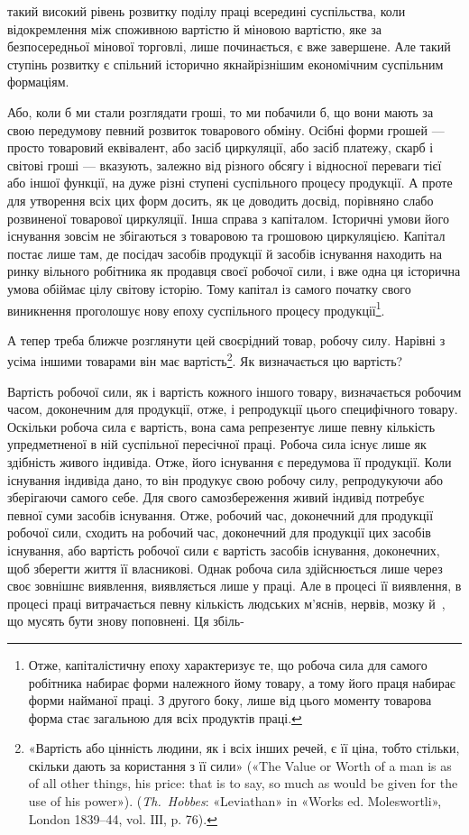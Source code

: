 \parcont{}  %
такий високий рівень розвитку поділу праці всередині суспільства,
коли відокремлення між споживною вартістю й міновою
вартістю, яке за безпосередньої мінової торговлі, лише починається,
є вже завершене. Але такий ступінь розвитку є спільний
історично якнайрізнішим економічним суспільним формаціям.

Або, коли б ми стали розглядати гроші, то ми побачили б,
що вони мають за свою передумову певний розвиток товарового
обміну. Осібні форми грошей — просто товаровий еквівалент,
або засіб циркуляції, або засіб платежу, скарб і світові гроші —
вказують, залежно від різного обсягу і відносної переваги тієї
або іншої функції, на дуже різні ступені суспільного процесу
продукції. А проте для утворення всіх цих форм досить, як це
доводить досвід, порівняно слабо розвиненої товарової циркуляції.
Інша справа з капіталом. Історичні умови його існування зовсім
не збігаються з товаровою та грошовою циркуляцією. Капітал
постає лише там, де посідач засобів продукції й засобів існування
находить на ринку вільного робітника як продавця своєї робочої
сили, і вже одна ця історична умова обіймає цілу світову історію.
Тому капітал із самого початку свого виникнення проголошує
нову епоху суспільного процесу продукції\footnote{
Отже, капіталістичну епоху характеризує те, що робоча сила для
самого робітника набирає форми належного йому товару, а тому його
праця набирає форми найманої праці. З другого боку, лише від цього моменту
товарова форма стає загальною для всіх продуктів праці.
}.

А тепер треба ближче розглянути цей своєрідний товар, робочу
силу. Нарівні з усіма іншими товарами він має вартість\footnote{
«Вартість або цінність людини, як і всіх інших речей, є її ціна,
тобто стільки, скільки дають за користання з її сили» («The Value or
Worth of a man is as of all other things, his price: that is to say, so much
as would be given for the use of his power»). (\emph{Th.~Hobbes}: «Leviathan»
in «Works ed. Moleswortli», London 1839--44, vol. IІІ, p. 76).
}. Як
визначається цю вартість?

Вартість робочої сили, як і вартість кожного іншого товару,
визначається робочим часом, доконечним для продукції, отже,
і репродукції цього специфічного товару. Оскільки робоча сила
є вартість, вона сама репрезентує лише певну кількість упредметненої
в ній суспільної пересічної праці. Робоча сила існує
лише як здібність живого індивіда. Отже, його існування є передумова
її продукції. Коли існування індивіда дано, то він продукує
свою робочу силу, репродукуючи або зберігаючи самого себе.
Для свого самозбереження живий індивід потребує певної суми
засобів існування. Отже, робочий час, доконечний для продукції
робочої сили, сходить на робочий час, доконечний для продукції
цих засобів існування, або вартість робочої сили є вартість засобів
існування, доконечних, щоб зберегти життя її власникові.
Однак робоча сила здійснюється лише через своє зовнішнє виявлення,
виявляється лише у праці. Але в процесі її виявлення,
в процесі праці витрачається певну кількість людських м’яснів,
нервів, мозку й~, що мусять бути знову поповнені. Ця збіль-
\parbreak{}  %
